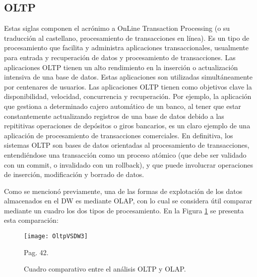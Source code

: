 \documentclass[a4paper,11pt]{article}
\begin{document}
    
    \subsection{OLTP}
    
    Estas siglas componen el acrónimo a OnLine Transaction Processing (o su traducción al castellano, procesamiento de transacciones en línea). Es un tipo
    de procesamiento que facilita y administra aplicaciones transaccionales, usualmente para entrada y recuperación de datos y procesamiento de
    transacciones.
    Las aplicaciones OLTP tienen un alto rendimiento en la inserción o actualización intensiva de una base de datos. Estas aplicaciones son utilizadas
    simultáneamente por centenares de usuarios. Las aplicaciones OLTP tienen como objetivos clave la disponibilidad, velocidad, concurrencia y recuperación.
    Por ejemplo, la aplicación que gestiona a determinado cajero automático de un banco, al tener que estar constantemente actualizando registros de una
    base de datos debido a las repititivas operaciones de depósitos o giros bancarios, es un claro ejemplo de una aplicación de procesamiento de
    transacciones comerciales.
    En definitiva, los sistemas OLTP son bases de datos orientadas al procesamiento de transacciones, entendiéndose una transacción como un proceso
    atómico (que debe ser validado con un commit, o invalidado con un rollback), y que puede involucrar operaciones de inserción, modificación y
    borrado de datos.\par
    
    Como se mencionó previamente, una de las formas de explotación de los datos almacenados en el DW es mediante OLAP, con lo cual se considera útil
    comparar mediante un cuadro los dos tipos de procesamiento. En la Figura \ref{oltp_vs_olap} se presenta esta comparación:
    
    \begin{figure}
      \begin{center}
        \texttt{[image: OltpVSDW3]}
        \caption{Cuadro comparativo entre el análisis OLTP y OLAP.} \cite{hefestov2} Pag. 42.
        \label{oltp_vs_olap}
      \end{center}
    \end{figure}
    
\end{document}
